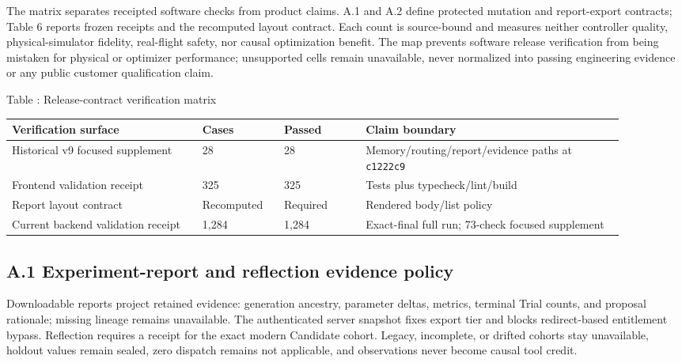 The matrix separates receipted software checks from product claims. A.1
and A.2 define protected mutation and report-export contracts; Table 6
reports frozen receipts and the recomputed layout contract. Each count is
source-bound and measures neither controller quality, physical-simulator
fidelity, real-flight safety, nor causal optimization benefit. The map
prevents software release verification from being mistaken for physical
or optimizer performance; unsupported cells remain unavailable, never
normalized into passing engineering evidence or any public customer
qualification claim.

\begin{center}
\begingroup
\footnotesize
\renewcommand{\arraystretch}{0.94}
\textnormal{Table \thetable: Release-contract verification matrix}\par
\vspace{0.18em}
\begin{tabular}{@{}L{0.28\linewidth}C{0.12\linewidth}C{0.12\linewidth}L{0.38\linewidth}@{}}
\toprule
\textbf{Verification surface} & \textbf{Cases} & \textbf{Passed} &
\textbf{Claim boundary}\tabularnewline
\midrule
Historical v9 focused supplement & 28 & 28 & Memory/routing/report/evidence
paths at \texttt{c1222c9}\tabularnewline
Frontend validation receipt & 325 & 325 & Tests plus
typecheck/lint/build\tabularnewline
Report layout contract & Recomputed & Required & Rendered body/list
policy\tabularnewline
Current backend validation receipt & 1,284 & 1,284 & Exact-final full run;
73-check focused supplement\tabularnewline
\bottomrule
\end{tabular}
\endgroup
\end{center}

\subsection{\texorpdfstring{\textbf{A.1 Experiment-report and reflection
evidence
policy}}{A.1 Experiment-report and reflection evidence policy}}\label{a.1-experiment-report-and-reflection-evidence-policy}

Downloadable reports project retained evidence: generation ancestry,
parameter deltas, metrics, terminal Trial counts, and proposal rationale;
missing lineage remains unavailable. The authenticated server snapshot
fixes export tier and blocks redirect-based entitlement bypass. Reflection
requires a receipt for the exact modern Candidate cohort. Legacy,
incomplete, or drifted cohorts stay unavailable, holdout values remain
sealed, zero dispatch remains not applicable, and observations never
become causal tool credit.

